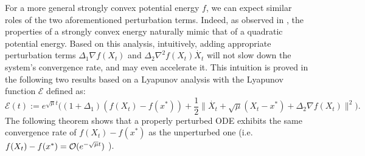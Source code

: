 \documentclass[11pt]{article}
\newcommand{\1}{\mathbf 1}
\numberwithin{equation}{section}
\begin{document}
For a more general strongly convex potential energy $f$, we can expect similar roles of the two aforementioned perturbation terms. Indeed, as observed in \cite{Yang_2018_physical}, the properties of a strongly convex energy naturally mimic that of a quadratic potential energy.   
Based on this analysis, intuitively, adding appropriate perturbation terms $\Delta_1\nabla f(X_t)$ and $\Delta_2\nabla^2 f(X_t)\dot{X_t}$ will not slow down the system's convergence rate, and may even accelerate it. 
This intuition is proved in the following two results 
based on a Lyapunov analysis with the Lyapunov function $\mathcal{E}$ defined as:
\begin{equation}
	\label{continuous Lyapunov for strong disturb ODE}
	\mathcal{E}(t) :=  e^{\sqrt{\mu}t}\big((1+\Delta_1)(f(X_t)-f(x^*))+\frac{1}{2}\|\dot{X_t}+\sqrt{\mu}(X_t-x^*)+\Delta_2\nabla f(X_t)\|^2\big).
\end{equation}
The following theorem shows that a properly perturbed ODE exhibits the same convergence rate of $f(X_t) - f(x^*)$ as the unperturbed one (i.e. $f(X_t)-f(x^*)={\cal O}(e^{-\sqrt{\mu}t})$ \cite[Proposition 5]{Wilson_2021_lyapunov}).
\end{document}

